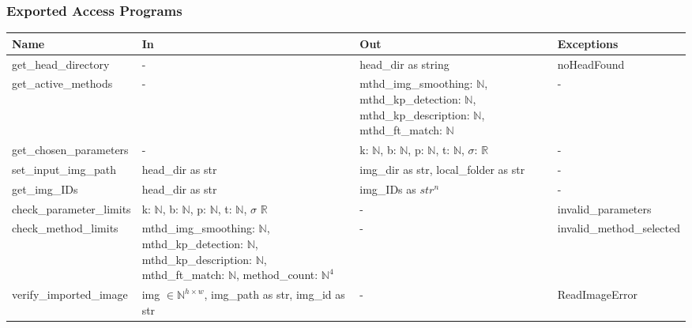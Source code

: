 \documentclass[12pt, titlepage]{article}
\begin{document}
\subsubsection{Exported Access Programs}
\begin{tabular}{p{3.75cm} p{4.5cm} p{4.5cm} p{3.5cm}}
\hline
\textbf{Name} & \textbf{In} & \textbf{Out} & \textbf{Exceptions} \\
\hline
get\_head\_directory 
& - 
& head\_dir as string 
& noHeadFound \\
\hline
get\_active\_methods 
& - 
& mthd\_img\_smoothing: $\mathbb{N}$, \newline 
mthd\_kp\_detection: $\mathbb{N}$, \newline 
mthd\_kp\_description: $\mathbb{N}$, \newline 
mthd\_ft\_match: $\mathbb{N}$
& - \\
\hline
get\_chosen\_parameters & - 
& k: $\mathbb{N}$, \newline 
b: $\mathbb{N}$, \newline  
p: $\mathbb{N}$, \newline 
t: $\mathbb{N}$, \newline 
$\sigma$: $\mathbb{R}$
& - \\
\hline
set\_input\_img\_path 
& head\_dir as str
& img\_dir as str, \newline 
local\_folder as str
& - \\
\hline
get\_img\_IDs 
& head\_dir as str 
& img\_IDs as $str^{n}$ 
& - \\
\hline
check\_parameter\_limits 
& k: $\mathbb{N}$, \newline 
b: $\mathbb{N}$, \newline  
p: $\mathbb{N}$, \newline 
t: $\mathbb{N}$, \newline 
$\sigma$ $\mathbb{R}$
& - 
& invalid\_parameters\\
\hline
check\_method\_limits 
& mthd\_img\_smoothing: $\mathbb{N}$, \newline 
mthd\_kp\_detection: $\mathbb{N}$, \newline  
mthd\_kp\_description: $\mathbb{N}$, \newline 
mthd\_ft\_match: $\mathbb{N}$, \newline 
method\_count: $\mathbb{N}^4$
& - 
& invalid\_method\_selected\\
\hline 
verify\_imported\_image 
& img $\in \mathbb{N}^{h \times w}$, \newline 
img\_path as str, \newline 
img\_id as str
& -
& ReadImageError\\
\hline
\end{tabular}
\end{document}
